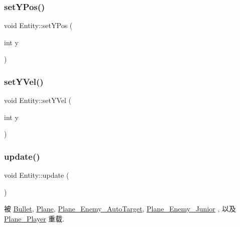 \subsubsection{\texorpdfstring{set\+Y\+Pos()}{setYPos()}}
{\footnotesize\ttfamily void Entity\+::set\+Y\+Pos (\begin{DoxyParamCaption}\item[{int}]{y }\end{DoxyParamCaption})\hspace{0.3cm}{\ttfamily [inline]}}

\mbox{\label{class_entity_a9d7c4a35217e6f83ac21da314aa3ec9a}} 
\subsubsection{\texorpdfstring{set\+Y\+Vel()}{setYVel()}}
{\footnotesize\ttfamily void Entity\+::set\+Y\+Vel (\begin{DoxyParamCaption}\item[{int}]{y }\end{DoxyParamCaption})\hspace{0.3cm}{\ttfamily [inline]}}

\mbox{\label{class_entity_a00b6eeaf99b35c8f8b10b5fbfc1baf4f}} 
\subsubsection{\texorpdfstring{update()}{update()}}
{\footnotesize\ttfamily void Entity\+::update (\begin{DoxyParamCaption}{ }\end{DoxyParamCaption})\hspace{0.3cm}{\ttfamily [virtual]}}



被 \hyperlink{class_bullet_a32f4a0611fe2dd245fee955d14ca1f68}{Bullet}, \hyperlink{class_plane_a7fbb07f76503fe057772e01f542afc32}{Plane}, \hyperlink{class_plane___enemy___auto_target_acae2a6f38bdc71d17188e2b7711f4d5b}{Plane\+\_\+\+Enemy\+\_\+\+Auto\+Target}, \hyperlink{class_plane___enemy___junior_a686e46c9927793dd07235cac72d52405}{Plane\+\_\+\+Enemy\+\_\+\+Junior} , 以及 \hyperlink{class_plane___player_ae68c08ce11fad9fd164c00eb4db6b348}{Plane\+\_\+\+Player} 重载.




